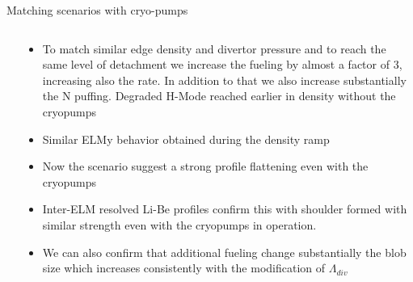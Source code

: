 \documentclass[10pt, compress]{beamer}
\newcommand\Fontvi{\fontsize{8}{7.2}\selectfont}
\begin{document}
\begin{frame}{Matching scenarios with cryo-pumps}
\Fontvi
  \vspace{-1cm}
\begin{columns}
  \begin{column}{0.65\textwidth}
  \end{column}
  \begin{column}{0.35\textwidth}
    \begin{itemize}
      \item<1-> To match similar edge density and divertor pressure
        and to reach the same level of detachment we increase the
        fueling by almost a factor of 3, increasing also the rate. In
        addition to that we also increase substantially the N
        puffing. \alert{Degraded H-Mode reached earlier in density
          without the cryopumps}
      \item<2-> Similar ELMy behavior obtained during the density ramp  
      \item<3-> Now the scenario suggest a strong profile flattening
        even with the cryopumps
       \item<4-> Inter-ELM resolved Li-Be profiles confirm this with
         shoulder formed with similar strength even with the cryopumps
         in operation.
         \item<5> We can also confirm that additional fueling change
           substantially the blob size which increases consistently
           with the modification of $\Lambda_{div}$
    \end{itemize}
  \end{column}
\end{columns}
\end{frame}
\end{document}
